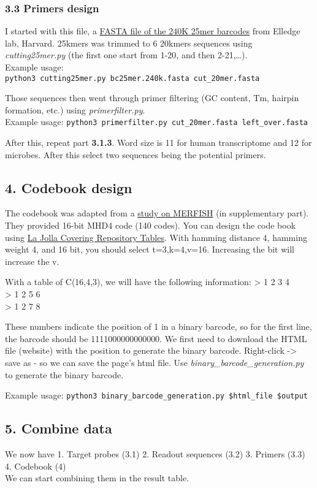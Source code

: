 \documentclass[
]{article}
\begin{document}
\subsubsection{3.3 Primers design}\label{primers-design}

I started with this file, a
\href{http://elledgelab.med.harvard.edu/wp-content/uploads/2013/07/bc25mer.240k.fasta_.zip}{FASTA
file of the 240K 25mer barcodes} from Elledge lab, Harvard. 25kmers was
trimmed to 6 20kmers sequences using \emph{cutting25mer.py} (the first
one start from 1-20, and then 2-21,\ldots).\\
Example usage:
\texttt{python3\ cutting25mer.py\ bc25mer.240k.fasta\ cut\_20mer.fasta}

Those sequences then went through primer filtering (GC content, Tm,
hairpin formation, etc.) using \emph{primerfilter.py}.\\
Example usage:
\texttt{python3\ primerfilter.py\ cut\_20mer.fasta\ left\_over.fasta}

After this, repeat part \textbf{3.1.3}. Word size is 11 for human
transcriptome and 12 for microbes. After this select two sequences being
the potential primers.

\subsection{4. Codebook design}\label{codebook-design}

The codebook was adapted from a
\href{https://www.science.org/doi/10.1126/science.aaa6090}{study on
MERFISH} (in supplementary part). They provided 16-bit MHD4 code (140
codes). You can design the code book using
\href{https://ljcr.dmgordon.org/cover/table.html}{La Jolla Covering
Repository Tables}. With hamming distance 4, hamming weight 4, and 16
bit, you should select t=3,k=4,v=16. Increasing the bit will increase
the v.

With a table of C(16,4,3), we will have the following information:
\textgreater{} 1 2 3 4\\
\textgreater{} 1 2 5 6\\
\textgreater{} 1 2 7 8

These numbers indicate the position of 1 in a binary barcode, so for the
first line, the barcode should be 1111000000000000. We first need to
download the HTML file (website) with the position to generate the
binary barcode. Right-click -\textgreater{} save as - so we can save the
page's html file. Use \emph{binary\_barcode\_generation.py} to generate
the binary barcode.

Example usage:
\texttt{python3\ binary\_barcode\_generation.py\ \$html\_file\ \$output}

\subsection{5. Combine data}\label{combine-data}

We now have 1. Target probes (3.1) 2. Readout sequences (3.2) 3. Primers
(3.3) 4. Codebook (4)\\

We can start combining them in the result table.
\end{document}

